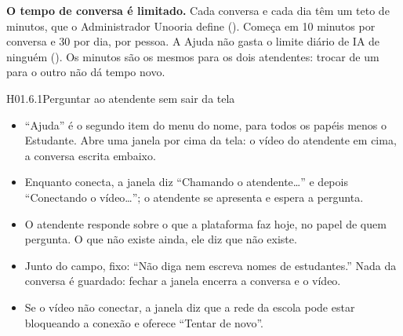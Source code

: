 \begin{nota}
\textbf{O tempo de conversa é limitado.} Cada conversa e cada dia têm um teto
de minutos, que o Administrador Unooria define (). Começa em 10
minutos por conversa e 30 por dia, por pessoa. A Ajuda não gasta o limite
diário de IA de ninguém (). Os minutos são os mesmos para os dois
atendentes: trocar de um para o outro não dá tempo novo.
\end{nota}

\begin{historia}{H01.6.1}{Perguntar ao atendente sem sair da tela}{\parcial}
\aceite
\begin{itemize}
  \item \enquote{Ajuda} é o segundo item do menu do nome, para todos os papéis
    menos o Estudante. Abre uma janela por cima da tela: o vídeo do atendente
    em cima, a conversa escrita embaixo.
  \item Enquanto conecta, a janela diz \enquote{Chamando o atendente\ldots} e
    depois \enquote{Conectando o vídeo\ldots}; o atendente se apresenta e
    espera a pergunta.
  \item O atendente responde sobre o que a plataforma faz hoje, no papel de
    quem pergunta. O que não existe ainda, ele diz que não existe.
  \item Junto do campo, fixo: \enquote{Não diga nem escreva nomes de
    estudantes.} Nada da conversa é guardado: fechar a janela encerra a
    conversa e o vídeo.
  \item Se o vídeo não conectar, a janela diz que a rede da escola pode estar
    bloqueando a conexão e oferece \enquote{Tentar de novo}.
\end{itemize}
\end{historia}

